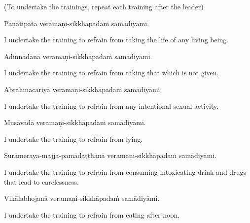 \begin{center}
  (To undertake the trainings, repeat each training after the leader)\\
\end{center}

Pāṇātipātā veramaṇi-sikkhāpadaṁ samādiyāmi.\\

\begin{english}
  I undertake the training to refrain from taking the life of any living being.\\
\end{english}

Adinnādānā veramaṇi-sikkhāpadaṁ samādiyāmi.\\

\begin{english}
  I undertake the training to refrain from taking that which is not given.\\
\end{english}

Abrahmacariyā veramaṇi-sikkhāpadaṁ samādiyāmi.\\

\begin{english}
  I undertake the training to refrain from any intentional sexual activity.\\
\end{english}

Musāvādā veramaṇi-sikkhāpadaṁ samādiyāmi.\\

\begin{english}
  I undertake the training to refrain from lying.\\
\end{english}

Surāmeraya-majja-pamādaṭṭhānā veramaṇi-sikkhāpadaṁ samādiyāmi.\\

\begin{english}
  I undertake the training to refrain from consuming intoxicating drink and drugs that\hyperlink{endnote138-appendix}{\hypertarget{endnote138-body}{}}
  lead to carelessness.\\
\end{english}

Vikālabhojanā veramaṇi-sikkhāpadaṁ samādiyāmi.\\

\begin{english}
  I undertake the training to refrain from eating after noon.\hyperlink{endnote139-appendix}{\hypertarget{endnote139-body}{}}\\
  \end{english}


